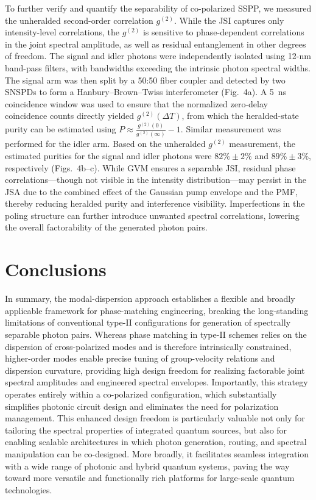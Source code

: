 \documentclass[aps, amsmath, amssymb,reprint,superscriptaddress]{revtex4-2}
\begin{document}
To further verify and quantify the separability of co-polarized SSPP, we measured the unheralded second-order correlation $g^{(2)}$. While the JSI captures only intensity-level correlations, the $g^{(2)}$ is sensitive to phase-dependent correlations in the joint spectral amplitude\cite{christ2011probing}, as well as residual entanglement in other degrees of freedom. The signal and idler photons were independently isolated using 12-nm band-pass filters, with bandwidths exceeding the intrinsic photon spectral widths. The signal arm was then split by a 50:50 fiber coupler and detected by two SNSPDs to form a Hanbury--Brown--Twiss interferometer (Fig.~4a). A 5~ns coincidence window was used to ensure that the normalized zero-delay coincidence counts directly yielded $g^{(2)}(\Delta T)$, from which the heralded-state purity can be estimated using $P \approx \frac{g^{(2)}(0)}{g^{(2)}(\infty)} - 1$. Similar measurement was performed for the idler arm. Based on the unheralded $g^{(2)}$ measurement, the estimated purities for the signal and idler photons were $82\%\pm2\%$ and $89\%\pm3\%$, respectively (Figs.~4b--c). While GVM ensures a separable JSI, residual phase correlations---though not visible in the intensity distribution---may persist in the JSA due to the combined effect of the Gaussian pump envelope and the PMF, thereby reducing heralded purity and interference visibility\cite{JSAphase}. Imperfections in the poling structure can further introduce unwanted spectral correlations, lowering the overall factorability of the generated photon pairs.


\section{Conclusions}
In summary, the modal-dispersion approach establishes a flexible and broadly applicable framework for phase-matching engineering, breaking the long-standing limitations of conventional type-II configurations for generation of spectrally separable photon pairs. Whereas phase matching in type-II schemes relies on the dispersion of cross-polarized modes and is therefore intrinsically constrained, higher-order modes enable precise tuning of group-velocity relations and dispersion curvature, providing high design freedom for realizing factorable joint spectral amplitudes and engineered spectral envelopes. Importantly, this strategy operates entirely within a co-polarized configuration, which substantially simplifies photonic circuit design and eliminates the need for polarization management. This enhanced design freedom is particularly valuable not only for tailoring the spectral properties of integrated quantum sources, but also for enabling scalable architectures in which photon generation, routing, and spectral manipulation can be co-designed. More broadly, it facilitates seamless integration with a wide range of photonic and hybrid quantum systems, paving the way toward more versatile and functionally rich platforms for large-scale quantum technologies.
\end{document}
